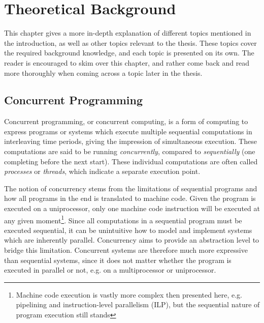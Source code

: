 

\chapter{Theoretical Background}
\label{ch:theoretical_background}


This chapter gives a more in\hyp{}depth explanation of different topics mentioned in the introduction, as well as other topics relevant to the thesis. These topics cover the required background knowledge, and each topic is presented on its own. The reader is encouraged to skim over this chapter, and rather come back and read more thoroughly when coming across a topic later in the thesis.


\section{Concurrent Programming}
\label{sec:concurrent_programming}


Concurrent programming, or concurrent computing, is a form of computing to express programs or systems which execute multiple sequential computations in interleaving time periods, giving the impression of simultaneous execution. These computations are said to be running \textit{concurrently}, compared to \textit{sequentially} (one completing before the next start). These individual computations are often called \textit{processes} or \textit{threads}, which indicate a separate execution point. 

The notion of concurrency stems from the limitations of sequential programs and how all programs in the end is translated to machine code. Given the program is executed on a uniprocessor, only one machine code instruction will be executed at any given moment\footnote{Machine code execution is vastly more complex then presented here, e.g. pipelining and instruction\hyp{}level parallelism (ILP), but the sequential nature of program execution still stands}.  Since all computations in a sequential program must be executed sequential, it can be unintuitive how to model and implement systems which are inherently parallel. Concurrency aims to provide an abstraction level to bridge this limitation. Concurrent systems are therefore much more expressive than sequential systems, since it does not matter whether the program is executed in parallel or not, e.g. on a multiprocessor or uniprocessor.

